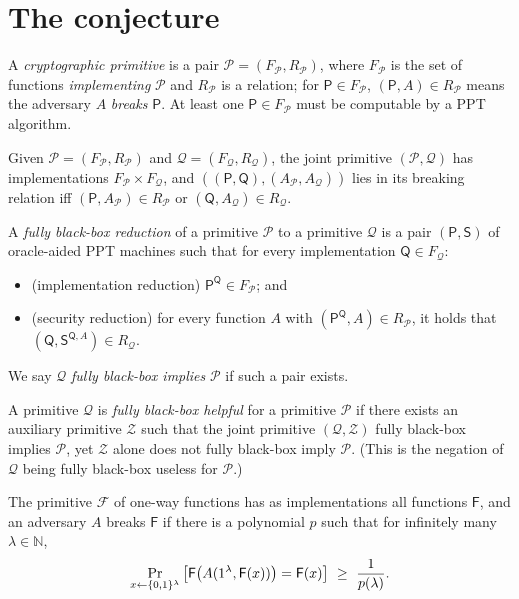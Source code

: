 \documentclass{aicr-conjecture}
\newcommand{\bits}{\{0,1\}}
\newcommand{\Fc}{\mathcal{F}}
\newcommand{\Zc}{\mathcal{Z}}
\newcommand{\Pc}{\mathcal{P}}
\newcommand{\Qc}{\mathcal{Q}}
\newcommand{\Fs}{\mathsf{F}}
\newcommand{\Ps}{\mathsf{P}}
\newcommand{\Qs}{\mathsf{Q}}
\newcommand{\Ss}{\mathsf{S}}
\begin{document}
\section{The conjecture}\label{sec:conjectures}

\begin{definition}\label{def:prim}
A \emph{cryptographic primitive} is a pair $\Pc=(F_{\Pc},R_{\Pc})$, where
$F_{\Pc}$ is the set of functions \emph{implementing} $\Pc$ and $R_{\Pc}$
is a relation; for $\Ps\in F_{\Pc}$, $(\Ps,A)\in R_{\Pc}$ means the
adversary $A$ \emph{breaks} $\Ps$. At least one $\Ps\in F_{\Pc}$ must be
computable by a PPT algorithm.
\end{definition}

\begin{definition}\label{def:joint}
Given $\Pc=(F_{\Pc},R_{\Pc})$ and $\Qc=(F_{\Qc},R_{\Qc})$, the joint
primitive $(\Pc,\Qc)$ has implementations $F_{\Pc}\times F_{\Qc}$, and
$((\Ps,\Qs),(A_{\Pc},A_{\Qc}))$ lies in its breaking relation iff
$(\Ps,A_{\Pc})\in R_{\Pc}$ or $(\Qs,A_{\Qc})\in R_{\Qc}$.
\end{definition}

\begin{definition}\label{def:fbb}
A \emph{fully black-box reduction} of a primitive $\Pc$ to a primitive
$\Qc$ is a pair $(\Ps,\Ss)$ of oracle-aided PPT machines such that for
every implementation $\Qs\in F_{\Qc}$:
\begin{itemize}
\item (implementation reduction) $\Ps^{\Qs}\in F_{\Pc}$; and
\item (security reduction) for every function $A$ with
  $(\Ps^{\Qs},A)\in R_{\Pc}$, it holds that
  $(\Qs,\Ss^{\Qs,A})\in R_{\Qc}$.
\end{itemize}
We say $\Qc$ \emph{fully black-box implies} $\Pc$ if such a pair exists.
\end{definition}

\begin{definition}\label{def:bbh}
A primitive $\Qc$ is \emph{fully black-box helpful} for a primitive $\Pc$
if there exists an auxiliary primitive $\Zc$ such that the joint
primitive $(\Qc,\Zc)$ fully black-box implies $\Pc$, yet $\Zc$ alone does
not fully black-box imply $\Pc$. (This is the negation of $\Qc$ being
fully black-box useless for $\Pc$.)
\end{definition}

\begin{definition}\label{def:owf}
The primitive $\Fc$ of one-way functions has as implementations all
functions $\Fs$, and an adversary $A$ breaks $\Fs$ if there is a
polynomial $p$ such that for infinitely many $\lambda\in\mathbb N$,
\[
  \Pr_{x\sample\bits^{\lambda}}
  \big[\Fs\big(A(1^{\lambda},\Fs(x))\big)=\Fs(x)\big]
  \ \ge\ \frac{1}{p(\lambda)} .
\]
\end{definition}
\end{document}
